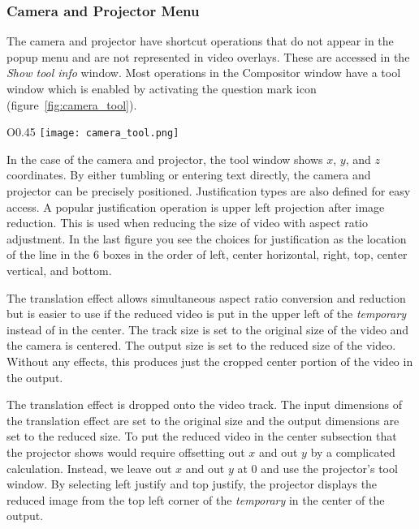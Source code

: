 \subsubsection*{Camera and Projector Menu}%
\label{ssub:camera_and_projector_menu}

The camera and projector have shortcut operations that do not appear in the popup menu and are not represented in video overlays. 
These are accessed in the \emph{Show tool info} window.
Most operations in the Compositor window have a tool window which is enabled by activating the question mark icon (figure~\ref{fig:camera_tool}).

\begin{wrapfigure}[10]{O}{0.45\linewidth} 
    \texttt{[image: camera\_tool.png]}
    \caption{Camera and Projector tool}
    \label{fig:camera_tool}
\end{wrapfigure}

In the case of the camera and projector, the tool window shows $x$, $y$, and $z$ coordinates. 
By either tumbling or entering text directly, the camera and projector can be precisely positioned.  
Justification types are also defined for easy access. 
A popular justification operation is upper left projection after image reduction. 
This is used when reducing the size of video with aspect ratio adjustment.  
In the last figure you see the choices for justification as the location of the line in the 6 boxes in the order of left, center horizontal, right, top, center vertical, and bottom.

The translation effect allows simultaneous aspect ratio conversion and reduction but is easier to use if the reduced video is put in the upper left of the \textit{temporary} instead of in the center. 
The track size is set to the original size of the video and the camera is centered. 
The output size is set to the reduced size of the video. 
Without any effects, this produces just the cropped center portion of the video in the output.

The translation effect is dropped onto the video track. The input dimensions of the translation effect are set to the original size and the output dimensions are set to the reduced size. 
To put the reduced video in the center subsection that the projector shows would require offsetting out $x$ and out $y$ by a complicated calculation. 
Instead, we leave out $x$ and out $y$ at 0 and use the projector's tool window. 
By selecting left justify and top justify, the projector displays the reduced image from the top left corner of the \textit{temporary} in the center of the output.

